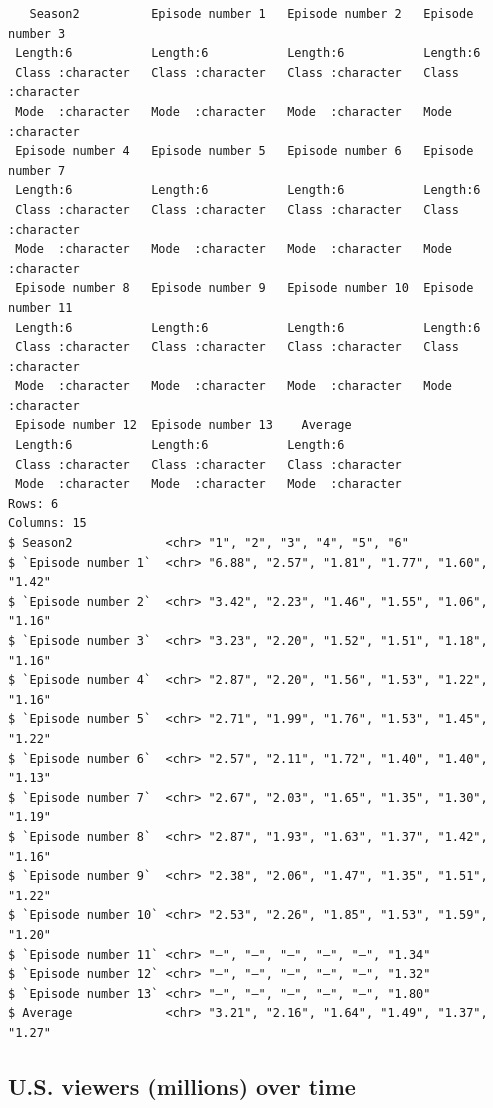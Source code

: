 \documentclass[
  letterpaper,
  DIV=11,
  numbers=noendperiod]{scrartcl}
\begin{document}
\begin{verbatim}
   Season2          Episode number 1   Episode number 2   Episode number 3  
 Length:6           Length:6           Length:6           Length:6          
 Class :character   Class :character   Class :character   Class :character  
 Mode  :character   Mode  :character   Mode  :character   Mode  :character  
 Episode number 4   Episode number 5   Episode number 6   Episode number 7  
 Length:6           Length:6           Length:6           Length:6          
 Class :character   Class :character   Class :character   Class :character  
 Mode  :character   Mode  :character   Mode  :character   Mode  :character  
 Episode number 8   Episode number 9   Episode number 10  Episode number 11 
 Length:6           Length:6           Length:6           Length:6          
 Class :character   Class :character   Class :character   Class :character  
 Mode  :character   Mode  :character   Mode  :character   Mode  :character  
 Episode number 12  Episode number 13    Average         
 Length:6           Length:6           Length:6          
 Class :character   Class :character   Class :character  
 Mode  :character   Mode  :character   Mode  :character  
Rows: 6
Columns: 15
$ Season2             <chr> "1", "2", "3", "4", "5", "6"
$ `Episode number 1`  <chr> "6.88", "2.57", "1.81", "1.77", "1.60", "1.42"
$ `Episode number 2`  <chr> "3.42", "2.23", "1.46", "1.55", "1.06", "1.16"
$ `Episode number 3`  <chr> "3.23", "2.20", "1.52", "1.51", "1.18", "1.16"
$ `Episode number 4`  <chr> "2.87", "2.20", "1.56", "1.53", "1.22", "1.16"
$ `Episode number 5`  <chr> "2.71", "1.99", "1.76", "1.53", "1.45", "1.22"
$ `Episode number 6`  <chr> "2.57", "2.11", "1.72", "1.40", "1.40", "1.13"
$ `Episode number 7`  <chr> "2.67", "2.03", "1.65", "1.35", "1.30", "1.19"
$ `Episode number 8`  <chr> "2.87", "1.93", "1.63", "1.37", "1.42", "1.16"
$ `Episode number 9`  <chr> "2.38", "2.06", "1.47", "1.35", "1.51", "1.22"
$ `Episode number 10` <chr> "2.53", "2.26", "1.85", "1.53", "1.59", "1.20"
$ `Episode number 11` <chr> "–", "–", "–", "–", "–", "1.34"
$ `Episode number 12` <chr> "–", "–", "–", "–", "–", "1.32"
$ `Episode number 13` <chr> "–", "–", "–", "–", "–", "1.80"
$ Average             <chr> "3.21", "2.16", "1.64", "1.49", "1.37", "1.27"
\end{verbatim}

\hypertarget{u.s.-viewers-millions-over-time}{%
\subsection{U.S. viewers (millions) over
time}\label{u.s.-viewers-millions-over-time}}
\end{document}
